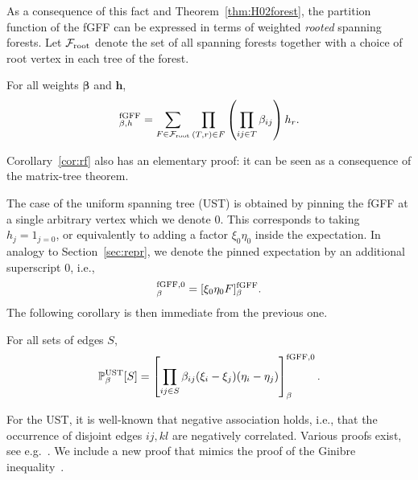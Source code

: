 \documentclass[11pt]{amsart}
\numberwithin{equation}{section}
\numberwithin{theorem}{section}
\newcommand{\ob}[1]{\left(#1\right )} %
\newcommand{\cb}[1]{\left[#1\right ]} %
\newcommand{\V}[1]{\boldsymbol{#1}}
\begin{document}
As a consequence of this fact and Theorem~\ref{thm:H02forest}, the
partition function of the fGFF can be expressed in terms of weighted
\emph{rooted} spanning forests.  Let $\mathcal{F}_{\rm root}$ denote
the set of all spanning forests together with a choice of root vertex
in each tree of the forest.
%
\begin{corollary}
  \label{cor:rf}
  For all weights $\V{\beta}$ and $\V{h}$,
  \begin{equation}
    [1]^{\rm fGFF}_{\beta,h} = \sum_{F \in \mathcal{F}_{\rm root}} \prod_{(T,r) \in F} \ob{\prod_{ij \in T} \beta_{ij}} h_r
    .
  \end{equation}
\end{corollary}
Corollary~\ref{cor:rf} also has an elementary proof: it can be seen as a
consequence of the matrix-tree theorem. 


The case of the uniform spanning tree (UST) is obtained by pinning the
fGFF at a single arbitrary
vertex which we denote $0$. This corresponds to taking $h_j = 1_{j=0}$,
or equivalently to adding a factor $\xi_0\eta_0$ inside the expectation.
In analogy to Section~\ref{sec:repr}, we denote the pinned expectation by
an additional superscript $0$, i.e.,
\begin{equation}
  [F]_\beta^{{\rm fGFF},0}  = [\xi_0\eta_0 F]_\beta^{\rm fGFF}.
\end{equation}
The following corollary is then immediate from the previous one.

\begin{corollary}
  For all sets of edges $S$,
  \begin{equation}
    \P_\beta^{\rm UST}[S] = \cb{\prod_{ij\in S}\beta_{ij} (\xi_i-\xi_j)(\eta_i-\eta_j)}_{\beta}^{{\rm fGFF},0}.
  \end{equation}
\end{corollary}

For the UST, it is well-known that negative association holds,
i.e., that the occurrence of disjoint edges $ij,kl$ are
negatively correlated.
Various proofs exist, see e.g.~\cite{MR2060630,FM}.
We include a new proof that mimics the proof of the Ginibre
inequality~\cite{MR0269252}.
\end{document}
